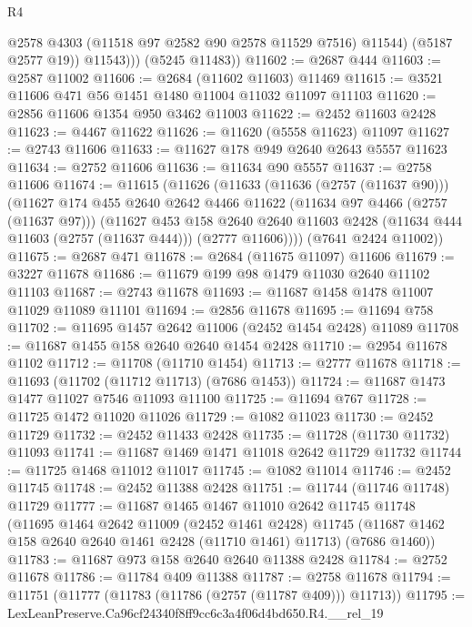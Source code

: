 \begin{lexlean}{R4}
\begin{coremodule}
                @2578
                @4303
                (@11518 @97 @2582 @90 @2578 @11529 @7516)
                @11544)
              (@5187 @2577 @19))
            @11543)))
      (@5245 @11483))
@11602 := @2687 @444
@11603 := @2587 @11002
@11606 := @2684 (@11602 @11603) @11469
@11615 := @3521 @11606 @471 @56 @1451 @1480 @11004 @11032 @11097 @11103
@11620 := @2856 @11606 @1354 @950 @3462 @11003
@11622 := @2452 @11603 @2428
@11623 := @4467 @11622
@11626 := @11620 (@5558 @11623) @11097
@11627 := @2743 @11606
@11633 := @11627 @178 @949 @2640 @2643 @5557 @11623
@11634 := @2752 @11606
@11636 := @11634 @90 @5557
@11637 := @2758 @11606
@11674 := @11615
    (@11626
      (@11633
        (@11636 (@2757 (@11637 @90)))
        (@11627
          @174
          @455
          @2640
          @2642
          @4466
          @11622
          (@11634 @97 @4466 (@2757 (@11637 @97)))
          (@11627
            @453
            @158
            @2640
            @2640
            @11603
            @2428
            (@11634 @444 @11603 (@2757 (@11637 @444)))
            (@2777 @11606))))
      (@7641 @2424 @11002))
@11675 := @2687 @471
@11678 := @2684 (@11675 @11097) @11606
@11679 := @3227 @11678
@11686 := @11679 @199 @98 @1479 @11030 @2640 @11102 @11103
@11687 := @2743 @11678
@11693 := @11687 @1458 @1478 @11007 @11029 @11089 @11101
@11694 := @2856 @11678
@11695 := @11694 @758
@11702 := @11695 @1457 @2642 @11006 (@2452 @1454 @2428) @11089
@11708 := @11687 @1455 @158 @2640 @2640 @1454 @2428
@11710 := @2954 @11678 @1102
@11712 := @11708 (@11710 @1454)
@11713 := @2777 @11678
@11718 := @11693 (@11702 (@11712 @11713) (@7686 @1453))
@11724 := @11687 @1473 @1477 @11027 @7546 @11093 @11100
@11725 := @11694 @767
@11728 := @11725 @1472 @11020 @11026
@11729 := @1082 @11023
@11730 := @2452 @11729
@11732 := @2452 @11433 @2428
@11735 := @11728 (@11730 @11732) @11093
@11741 := @11687 @1469 @1471 @11018 @2642 @11729 @11732
@11744 := @11725 @1468 @11012 @11017
@11745 := @1082 @11014
@11746 := @2452 @11745
@11748 := @2452 @11388 @2428
@11751 := @11744 (@11746 @11748) @11729
@11777 := @11687
    @1465
    @1467
    @11010
    @2642
    @11745
    @11748
    (@11695
      @1464
      @2642
      @11009
      (@2452 @1461 @2428)
      @11745
      (@11687 @1462 @158 @2640 @2640 @1461 @2428 (@11710 @1461) @11713)
      (@7686 @1460))
@11783 := @11687 @973 @158 @2640 @2640 @11388 @2428
@11784 := @2752 @11678
@11786 := @11784 @409 @11388
@11787 := @2758 @11678
@11794 := @11751 (@11777 (@11783 (@11786 (@2757 (@11787 @409))) @11713))
@11795 := LexLeanPreserve.Ca96cf24340f8ff9cc6c3a4f06d4bd650.R4.__rel_19

\end{coremodule}
\end{lexlean}

